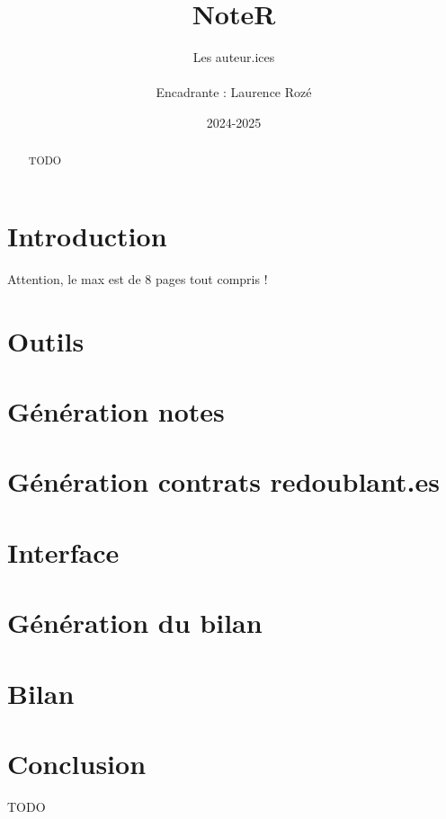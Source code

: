 \documentclass[a4paper,11pt]{article}
\title{\textbf{NoteR}}
\author{Les auteur.ices
	\\ \\
	Encadrante : Laurence Rozé}
\date{2024-2025}                    %
\begin{document}
  \maketitle %



\begin{abstract}
TODO
\end{abstract}

\section*{Introduction}
	Attention, le max est de 8 pages tout compris !

\section{Outils}
  
\section{Génération notes }	

\section{Génération contrats redoublant.es}
  

\section{Interface }

\section{Génération du bilan }

\section{Bilan }
  

\section*{Conclusion}
TODO


\end{document}
